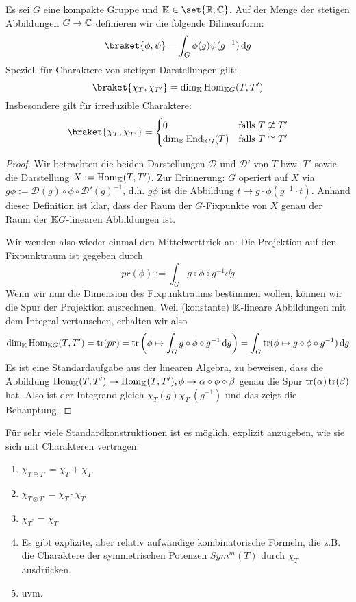 \begin{theorem}[1.Orthogonalitätsrelation]
Es sei $G$ eine kompakte Gruppe und $\IK\in\set{\IR,\IC}$. Auf der Menge der stetigen Abbildungen $G\to\mathbb{C}$ definieren wir die folgende Bilinearform:
\[\braket{\phi,\psi} = \int_G \phi(g)\psi(g^{-1}) \dd g\]
Speziell für Charaktere von stetigen Darstellungen gilt:
\[\braket{\chi_T, \chi_{T'}} = \dim_\IK \Hom_{\IK G}(T,T')\]
Insbesondere gilt für irreduzible Charaktere:
\[\braket{\chi_T, \chi_{T'}} = \begin{cases} 0 & \text{falls }T\not\isomorphic T' \\ \dim_\IK \End_{\IK G}(T) & \text{falls }T\isomorphic T'\end{cases}\]
\end{theorem}
\begin{proof}
Wir betrachten die beiden Darstellungen $\mathcal{D}$ und $\mathcal{D}'$ von $T$ bzw. $T'$ sowie die Darstellung $X:=\operatorname{Hom}_{\mathbb{K}}(T,T')$. Zur Erinnerung: $G$ operiert auf $X$ via $g\phi := \mathcal{D}(g)\circ\phi\circ \mathcal{D}'(g)^{-1}$, d.h. $g\phi$ ist die Abbildung $t\mapsto g\cdot\phi(g^{-1}\cdot t)$. Anhand dieser Definition ist klar, dass der Raum der $G$-Fixpunkte von $X$ genau der Raum der $\mathbb{K} G$-linearen Abbildungen ist.

\smallbreak
Wir wenden also wieder einmal den Mittelwerttrick an: Die Projektion auf den Fixpunktraum ist gegeben durch
\[pr(\phi) := \int_G g\circ\phi\circ g^{-1} \dd g\]
Wenn wir nun die Dimension des Fixpunktraums bestimmen wollen, können wir die Spur der Projektion ausrechnen. Weil (konstante) $\mathbb{K}$-lineare Abbildungen mit dem Integral vertauschen, erhalten wir also
\[\dim_{\mathbb{K}} \operatorname{Hom}_{\mathbb{K} G}(T,T') = \operatorname{tr}(pr) = \operatorname{tr}\left(\phi \mapsto \int_G g\circ\phi\circ g^{-1} \,\textrm{d} g \right) = \int_G \operatorname{tr}(\phi \mapsto g\circ \phi\circ g^{-1}) \,\textrm{d} g\]
Es ist eine Standardaufgabe aus der linearen Algebra, zu beweisen, dass die Abbildung $\operatorname{Hom}_{\mathbb{K}}(T,T') \to \operatorname{Hom}_{\mathbb{K}}(T,T'), \phi \mapsto \alpha\circ\phi\circ\beta$ genau die Spur $\operatorname{tr}(\alpha)\operatorname{tr}(\beta)$ hat. Also ist der Integrand gleich $\chi_T(g)\chi_{T'}(g^{-1})$ und das zeigt die Behauptung.
\end{proof}

\begin{remark}
Für sehr viele Standardkonstruktionen ist es möglich, explizit anzugeben, wie sie sich mit Charakteren vertragen:
\begin{enumerate}
\item $\chi_{T\oplus T'} = \chi_T + \chi_{T'}$
\item $\chi_{T\otimes T'} = \chi_T \cdot \chi_{T'}$
\item $\chi_{T^\ast} = \overline{\chi_T}$
\item Es gibt explizite, aber relativ aufwändige kombinatorische Formeln, die z.B. die Charaktere der symmetrischen Potenzen $Sym^m(T)$ durch $\chi_T$ ausdrücken.
\item uvm.
\end{enumerate}
\end{remark}

